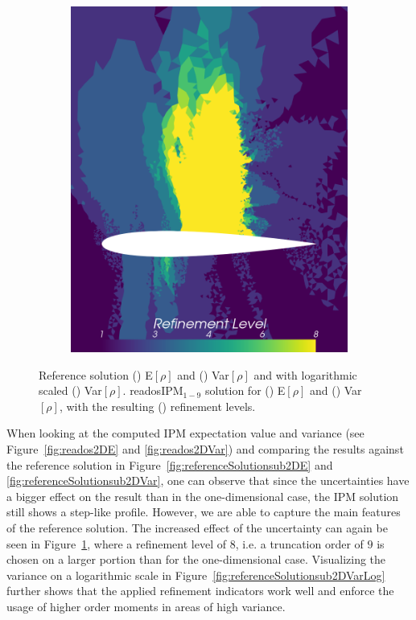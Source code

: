\begin{figure}[h!]
\begin{subfigure}{0.329\linewidth}
		\includegraphics[width=\linewidth]{figs/Euler2D/retadosIPM9-4MaP_4_refinementLevel.png}
		\caption{}
		\label{fig:readosIPMEVar2DRefinement}
	\end{subfigure}
	\caption{Reference solution () E$[\rho]$ and () Var$[\rho]$ and with logarithmic scaled () Var$[\rho]$. readosIPM$_{1-9}$ solution for () E$[\rho]$ and () Var$[\rho]$, with the resulting () refinement levels.}
	\label{fig:refAndreadosIPMEVar2D}
\end{figure}
When looking at the computed IPM expectation value and variance (see Figure~\ref{fig:reados2DE} and \ref{fig:reados2DVar}) and comparing the results against the reference solution in Figure~\ref{fig:referenceSolutionsub2DE} and \ref{fig:referenceSolutionsub2DVar}, one can observe that since the uncertainties have a bigger effect on the result than in the one-dimensional case, the IPM solution still shows a step-like profile. However, we are able to capture the main features of the reference solution. The increased effect of the uncertainty can again be seen in Figure~\ref{fig:readosIPMEVar2DRefinement}, where a refinement level of $8$, i.e. a truncation order of $9$ is chosen on a larger portion than for the one-dimensional case. Visualizing the variance on a logarithmic scale in Figure~\ref{fig:referenceSolutionsub2DVarLog} further shows that the applied refinement indicators work well and enforce the usage of higher order moments in areas of high variance.

